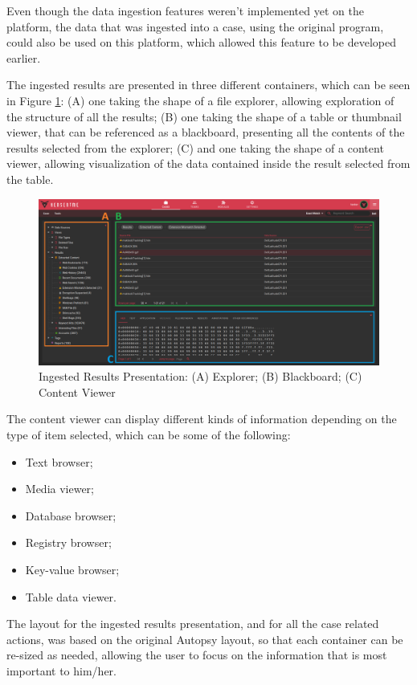 Even though the data ingestion features weren't implemented yet on the platform, the data that was ingested into a case, using the original program, could also be used on this platform, which allowed this feature to be developed earlier.

The ingested results are presented in three different containers, which can be seen in Figure \ref{fig:data}: (A) one taking the shape of a file explorer, allowing exploration of the structure of all the results; 
(B) one taking the shape of a table or thumbnail viewer, that can be referenced as a blackboard, presenting all the contents of the results selected from the explorer; (C) and one taking the shape of a content viewer, allowing visualization
of the data contained inside the result selected from the table.

\pagebreak

\begin{figure}[ht]
 \centering
 \includegraphics[width=1\linewidth]{imgs/data.png}
 \caption{Ingested Results Presentation: (A) Explorer; (B) Blackboard; (C) Content Viewer}
 \label{fig:data}
\end{figure}

The content viewer can display different kinds of information depending on the type of item selected, which can be some of the following:
\begin{itemize}
 \item Text browser;
 \item Media viewer;
 \item Database browser;
 \item Registry browser;
 \item Key-value browser;
 \item Table data viewer.
\end{itemize}

The layout for the ingested results presentation, and for all the case related actions, was based on the original Autopsy layout, so that each container can be re-sized as
needed, allowing the user to focus on the information that is most important to him/her.

